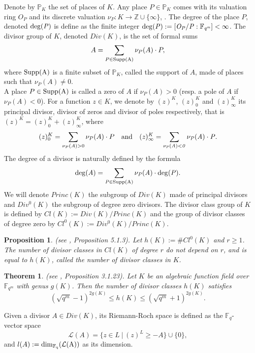 \documentclass[10pt]{article}
\newtheorem{thm}{Theorem}[]
\newtheorem{prop1}{Proposition}[]
\newcommand{\s}{\vspace{0.3cm}}
\newcommand{\cd}{\cdot}
\newcommand{\Z}{\mathbb{Z}}
\newcommand{\fqm}{\mathbb{F}_{q^m}}
\newcommand{\fq}{\mathbb{F}_q}
\begin{document}
Denote by $\mathbb{P}_K$ the set of places of $K$. Any place $P \in \mathbb{P}_K$ comes with its valuation ring $O_P$ and its discrete valuation $\nu_P : K \rightarrow \Z \cup \{\infty\}$, . The degree of the place $P$, denoted $\rm{deg}(\it P)$ is define as the finite integer $\rm{deg}( \it P) := \it [O_P/P:\fqm] < \infty$.
The divisor group of $K$, denoted $Div(K)$, is the set of formal sums 
\[A = \sum\limits_{P \in \rm{Supp}(A)} \nu_P(A) \cd P,\]
where $\rm{Supp}(A)$ is a finite subset of $\mathbb{P}_K$, called the support of $A$, made of places such that $\nu_{P}(A) \neq 0$. \\ A place  $P \in \rm{Supp}(A)$ is called a zero of $A$ if $\nu_P(A) >0$ (resp. a pole of $A$ if $\nu_P(A) < 0$). For a function $z \in K$, we denote by $(z)^K$, $(z)^K_0$ and $(z)^K_{\infty}$ its principal divisor, divisor of zeros and divisor of poles respectively, that is $(z)^K = (z)^K_0 + (z)^K_{\infty}$, where 
\[(z)^K_0 = \sum\limits_{\nu_P(A) > 0}\nu_P(A) \cd P \quad \rm{and} \it \quad (z)^K_{\infty} = \sum\limits_{\nu_P(A) < 0}\nu_P(A) \cd P.\]
The degree of a divisor is naturally defined by the formula
\[\rm{deg} (\it A) = \sum\limits_{P \in \rm{Supp}(A)} \nu_P(A) \cd \rm{deg}(\it P).\]
\s
We will denote $Princ(K)$ the subgroup of $Div(K)$ made of principal divisors and $Div^0(K)$ the subgroup of degree zero divisors. The divisor class group of $K$ is defined by $Cl(K):=Div(K)/Princ(K)$ and the group of divisor classes of degree zero by $Cl^0(K):=Div^0(K)/Princ(K)$. 

\s

\begin{prop1} \label{divclass} \rm (see \cite{Sti}, Proposition 5.1.3).  \it
Let $h(K) := \# Cl^0(K)$ and $r \geq 1$. The number of divisor classes in $Cl(K)$ of degree $r$ do not depend on $r$, and is equal to $h(K)$, called the number of divisor classes in $K$.
\end{prop1}

\s

\begin{thm} \rm (see \cite{Tsf}, Proposition 3.1.23). \it \label{esti h(X)}
Let $K$ be an algebraic function field over $\fqm$ with genus $g(K)$. Then the number of divisor classes $h(K)$ satisfies
\[ (\sqrt{q^m}-1)^{2g(K)} \leq h(K) \leq (\sqrt{q^m}+1)^{2g(K)}.\]
\end{thm}
\s

Given a divisor $A \in Div(K)$, its Riemann-Roch space is defined as the $\fq$-vector space
\[\mathcal{L}(A) = \{z \in L \ | \ (z)^L \geq -A\} \cup \{0\},\]
and $l(A):= \rm{dim}_{\fq}(\mathcal{L}(A))$ as its dimension.
\end{document}

